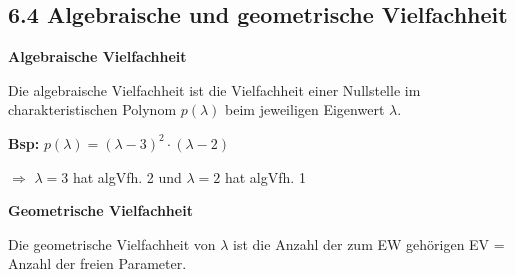 \subsection{6.4 Algebraische und geometrische Vielfachheit}{

\begin{center}
\end{center}
\vspace{3pt}

\textbf{Algebraische Vielfachheit} \par \vskip1pt
Die algebraische Vielfachheit ist die Vielfachheit einer Nullstelle im charakteristischen Polynom $p(\lambda)$ beim jeweiligen Eigenwert $\lambda$. \par
\vskip4pt
\hskip6pt \textbf{Bsp:} $p(\lambda) = (\lambda - 3)^2 \cdot (\lambda - 2)$ \par \vskip1pt
\hskip17pt $\Longrightarrow$ $\lambda = 3$ hat algVfh. 2 und $\lambda = 2$ hat algVfh. 1

\vskip3pt

\textbf{Geometrische Vielfachheit} \par \vskip1pt
Die geometrische Vielfachheit von $\lambda$ ist die Anzahl der zum EW gehörigen EV = Anzahl der freien Parameter.
}
\WhiteSpace